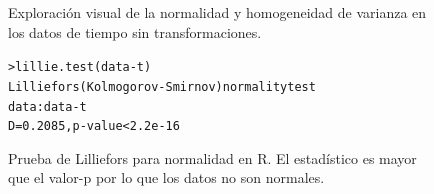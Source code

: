 \begin{figure}[H]
    \centering
    \caption{Exploración visual de la normalidad y homogeneidad de varianza en los datos de tiempo sin transformaciones.}
    \label{fig:sin-transformacion}
\end{figure}


\begin{figure}[H]
    \centering
        \small{
        \begin{alltt}
        
        
            > lillie.test(data-t)
                Lilliefors (Kolmogorov-Smirnov) normality test
            data:  data-t
            D = 0.2085, p-value < 2.2e-16
        \end{alltt}
        }
    
    \caption{Prueba de Lilliefors para normalidad en R. El estadístico es mayor que el valor-p por lo que los datos no son normales.}
    \label{fig:lillie-t}
\end{figure}

